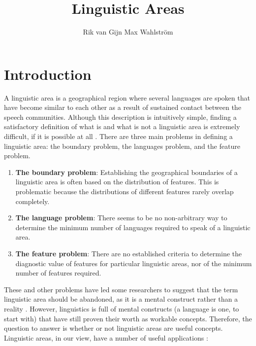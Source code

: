 \documentclass[output=paper,
modfonts
]{langscibook}
\title{Linguistic Areas}
\author{
 Rik van Gijn\affiliation{Leiden University} \lastand
 Max Wahlström\affiliation{University of Helsinki} 
}
\begin{document}
\maketitle %

\section{Introduction}


A linguistic area is a geographical region where several languages are spoken that have become similar to each other as a result of sustained contact between the speech communities. Although this description is intuitively simple, finding a satisfactory definition of what is and what is not a linguistic area is extremely difficult, if it is possible at all \parencite[see, e.g.][]{Masica2001Definition, Stolz2002No, Stolz2006All,Campbell2006Linguistic}. There are three main problems in defining a linguistic area: the boundary problem, the languages problem, and the feature problem.

\begin{enumerate}
\item \textbf{The boundary problem}: Establishing the geographical boundaries of a linguistic area is often based on the distribution of features. This is problematic because the distributions of different features rarely overlap completely. 
\item \textbf{The language problem}: There seems to be no non-arbitrary way to determine the minimum number of languages required to speak of a linguistic area.
\item \textbf{The feature problem}: There are no established criteria to determine the diagnostic value of features for particular linguistic areas, nor of the minimum number of features required.
\end{enumerate}

These and other problems have led some researchers to suggest that the term linguistic area should be abandoned, as it is a mental construct rather than a reality \parencite[see in particular][]{Stolz2006All, Campbell2006Linguistic}. However, linguistics is full of mental constructs (a language is one, to start with) that have still proven their worth as workable concepts. Therefore, the question to answer is whether or not linguistic areas are useful concepts. Linguistic areas, in our view, have a number of useful applications \parencite[see also][]{GijnForthcSeparating}:
\end{document}
